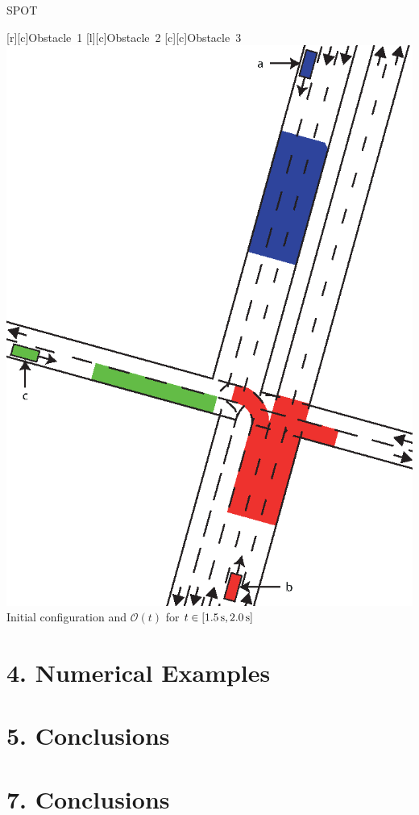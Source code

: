 \documentclass[shortpres,aspectratio=43]{beamer}
\begin{document}
\begin{frame}{SPOT}
\begin{center}
	{\footnotesize
	[c]{Obstacle~1}	
	[c]{Obstacle~2}
	[c]{Obstacle~3}
	\includegraphics[height=0.5\textheight]{./figures/Scenario_Intersection_Occ_1,5-2,0s_final.eps}
	} \\
	\vspace{1em}
	Initial configuration and $\mathcal{O}(t)$ for $t \in [\unit[1.5]{s}, \unit[2.0]{s}]$
\end{center}

\end{frame}

\section{4. Numerical Examples}



\section{5. Conclusions}


\section{7. Conclusions}


\end{document}
